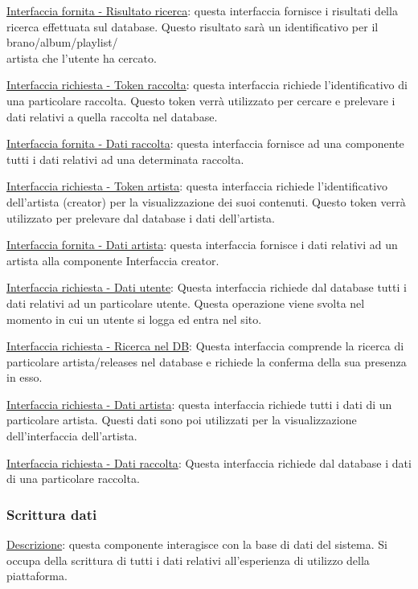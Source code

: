 \documentclass[a4paper,12pt]{article}
\begin{document}
\underline{Interfaccia fornita - Risultato ricerca}: questa interfaccia fornisce i risultati della ricerca effettuata sul database. Questo risultato sarà un identificativo per il brano/album/playlist/\\artista che l’utente ha cercato.

\underline{Interfaccia richiesta - Token raccolta}: questa interfaccia richiede l’identificativo di una particolare raccolta. Questo token verrà utilizzato per cercare e prelevare i dati relativi a quella raccolta nel database.

\underline{Interfaccia fornita - Dati raccolta}: questa interfaccia fornisce ad una componente tutti i dati relativi ad una determinata raccolta.

\underline{Interfaccia richiesta - Token artista}: questa interfaccia richiede l’identificativo dell’artista (creator) per la visualizzazione dei suoi contenuti. Questo token verrà utilizzato per prelevare dal database i dati dell’artista.

\underline{Interfaccia fornita - Dati artista}: questa interfaccia fornisce i dati relativi ad un artista alla componente Interfaccia creator.

\underline{Interfaccia richiesta - Dati utente}: Questa interfaccia richiede dal database tutti i dati relativi ad un particolare utente. Questa operazione viene svolta nel momento in cui un utente si logga ed entra nel sito.

\underline{Interfaccia richiesta - Ricerca nel DB}: Questa interfaccia comprende la ricerca di particolare artista/releases nel database e richiede la conferma della sua presenza in esso.

\underline{Interfaccia richiesta - Dati artista}: questa interfaccia richiede tutti i dati di un particolare artista. Questi dati sono poi utilizzati per la visualizzazione dell’interfaccia dell’artista.

\underline{Interfaccia richiesta - Dati raccolta}: Questa interfaccia richiede dal database i dati di una particolare raccolta.

\subsubsection{Scrittura dati}

\underline{Descrizione}: questa componente interagisce con la base di dati del sistema. Si occupa della scrittura di tutti i dati relativi all'esperienza di utilizzo della piattaforma.
\end{document}
